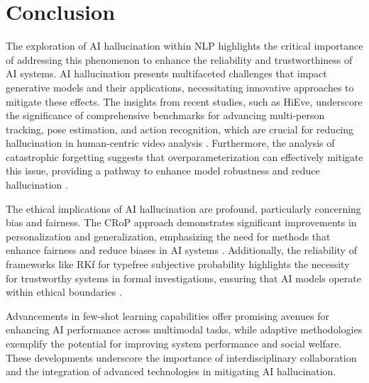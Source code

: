 \section{Conclusion} \label{sec:Conclusion}





The exploration of AI hallucination within NLP highlights the critical importance of addressing this phenomenon to enhance the reliability and trustworthiness of AI systems. AI hallucination presents multifaceted challenges that impact generative models and their applications, necessitating innovative approaches to mitigate these effects. The insights from recent studies, such as HiEve, underscore the significance of comprehensive benchmarks for advancing multi-person tracking, pose estimation, and action recognition, which are crucial for reducing hallucination in human-centric video analysis \cite{lin2023humaneventslargescalebenchmark}. Furthermore, the analysis of catastrophic forgetting suggests that overparameterization can effectively mitigate this issue, providing a pathway to enhance model robustness and reduce hallucination \cite{goldfarb2022analysiscatastrophicforgettingrandom}.



The ethical implications of AI hallucination are profound, particularly concerning bias and fairness. The CRoP approach demonstrates significant improvements in personalization and generalization, emphasizing the need for methods that enhance fairness and reduce biases in AI systems \cite{kaur2024cropcontextwiserobuststatic}. Additionally, the reliability of frameworks like RKf for typefree subjective probability highlights the necessity for trustworthy systems in formal investigations, ensuring that AI models operate within ethical boundaries \cite{cieslinski2022axiomstypefreesubjectiveprobability}.



Advancements in few-shot learning capabilities offer promising avenues for enhancing AI performance across multimodal tasks, while adaptive methodologies exemplify the potential for improving system performance and social welfare. These developments underscore the importance of interdisciplinary collaboration and the integration of advanced technologies in mitigating AI hallucination.